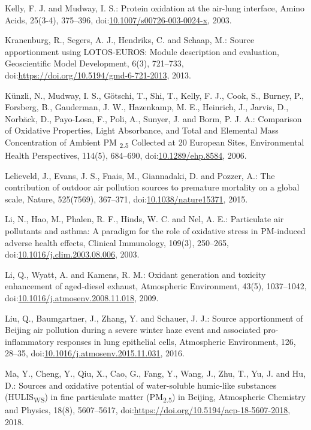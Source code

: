 \documentclass[
]{article}
\begin{document}
Kelly, F. J. and Mudway, I. S.: Protein oxidation at the air-lung
interface, Amino Acids, 25(3-4), 375--396,
doi:\href{https://doi.org/10.1007/s00726-003-0024-x}{10.1007/s00726-003-0024-x},
2003.

Kranenburg, R., Segers, A. J., Hendriks, C. and Schaap, M.: Source
apportionment using LOTOS-EUROS: Module description and evaluation,
Geoscientific Model Development, 6(3), 721--733,
doi:\href{https://doi.org/https://doi.org/10.5194/gmd-6-721-2013}{https://doi.org/10.5194/gmd-6-721-2013},
2013.

Künzli, N., Mudway, I. S., Götschi, T., Shi, T., Kelly, F. J., Cook, S.,
Burney, P., Forsberg, B., Gauderman, J. W., Hazenkamp, M. E., Heinrich,
J., Jarvis, D., Norbäck, D., Payo-Losa, F., Poli, A., Sunyer, J. and
Borm, P. J. A.: Comparison of Oxidative Properties, Light Absorbance,
and Total and Elemental Mass Concentration of Ambient PM
\textsubscript{2.5} Collected at 20 European Sites, Environmental Health
Perspectives, 114(5), 684--690,
doi:\href{https://doi.org/10.1289/ehp.8584}{10.1289/ehp.8584}, 2006.

Lelieveld, J., Evans, J. S., Fnais, M., Giannadaki, D. and Pozzer, A.:
The contribution of outdoor air pollution sources to premature mortality
on a global scale, Nature, 525(7569), 367--371,
doi:\href{https://doi.org/10.1038/nature15371}{10.1038/nature15371},
2015.

Li, N., Hao, M., Phalen, R. F., Hinds, W. C. and Nel, A. E.: Particulate
air pollutants and asthma: A paradigm for the role of oxidative stress
in PM-induced adverse health effects, Clinical Immunology, 109(3),
250--265,
doi:\href{https://doi.org/10.1016/j.clim.2003.08.006}{10.1016/j.clim.2003.08.006},
2003.

Li, Q., Wyatt, A. and Kamens, R. M.: Oxidant generation and toxicity
enhancement of aged-diesel exhaust, Atmospheric Environment, 43(5),
1037--1042,
doi:\href{https://doi.org/10.1016/j.atmosenv.2008.11.018}{10.1016/j.atmosenv.2008.11.018},
2009.

Liu, Q., Baumgartner, J., Zhang, Y. and Schauer, J. J.: Source
apportionment of Beijing air pollution during a severe winter haze event
and associated pro-inflammatory responses in lung epithelial cells,
Atmospheric Environment, 126, 28--35,
doi:\href{https://doi.org/10.1016/j.atmosenv.2015.11.031}{10.1016/j.atmosenv.2015.11.031},
2016.

Ma, Y., Cheng, Y., Qiu, X., Cao, G., Fang, Y., Wang, J., Zhu, T., Yu, J.
and Hu, D.: Sources and oxidative potential of water-soluble humic-like
substances (HULIS\textsubscript{WS}) in fine particulate matter
(PM\textsubscript{2.5}) in Beijing, Atmospheric Chemistry and Physics,
18(8), 5607--5617,
doi:\href{https://doi.org/https://doi.org/10.5194/acp-18-5607-2018}{https://doi.org/10.5194/acp-18-5607-2018},
2018.
\end{document}
